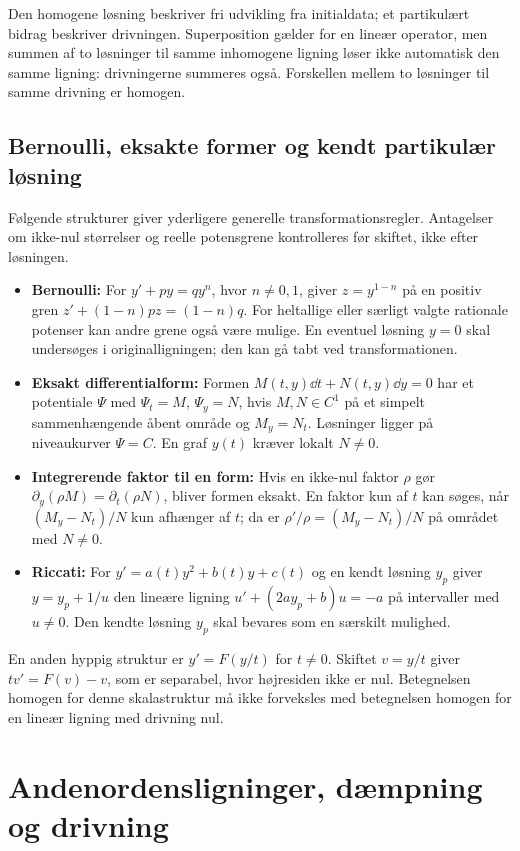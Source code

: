Den homogene løsning beskriver fri udvikling fra initialdata; et
partikulært bidrag beskriver drivningen. Superposition gælder for en
lineær operator, men summen af to løsninger til samme inhomogene ligning
løser ikke automatisk den samme ligning: drivningerne summeres også.
Forskellen mellem to løsninger til samme drivning er homogen.

\subsection{Bernoulli, eksakte former og kendt partikulær løsning}
Følgende strukturer giver yderligere generelle transformationsregler.
Antagelser om ikke-nul størrelser og reelle potensgrene kontrolleres
før skiftet, ikke efter løsningen.
\begin{itemize}
\item \textbf{Bernoulli:} For $y'+py=qy^n$, hvor $n\ne0,1$, giver
$z=y^{1-n}$ på en positiv gren
$z'+(1-n)pz=(1-n)q$. For heltallige eller særligt valgte rationale
potenser kan andre grene også være mulige. En eventuel løsning $y=0$
skal undersøges i originalligningen; den kan gå tabt ved transformationen.
\item \textbf{Eksakt differentialform:} Formen
$M(t,y)\dd t+N(t,y)\dd y=0$ har et potentiale $\Psi$ med
$\Psi_t=M$, $\Psi_y=N$, hvis $M,N\in C^1$ på et simpelt sammenhængende
åbent område og $M_y=N_t$. Løsninger ligger på niveaukurver
$\Psi=C$. En graf $y(t)$ kræver lokalt $N\ne0$.
\item \textbf{Integrerende faktor til en form:} Hvis en ikke-nul faktor
$\rho$ gør $\partial_y(\rho M)=\partial_t(\rho N)$, bliver formen
eksakt. En faktor kun af $t$ kan søges, når
$(M_y-N_t)/N$ kun afhænger af $t$; da er
$\rho'/\rho=(M_y-N_t)/N$ på området med $N\ne0$.
\item \textbf{Riccati:} For $y'=a(t)y^2+b(t)y+c(t)$ og en kendt løsning
$y_p$ giver $y=y_p+1/u$ den lineære ligning
$u'+(2ay_p+b)u=-a$ på intervaller med $u\ne0$.
Den kendte løsning $y_p$ skal bevares som en særskilt mulighed.
\end{itemize}
En anden hyppig struktur er $y'=F(y/t)$ for $t\ne0$. Skiftet $v=y/t$
giver $t v'=F(v)-v$, som er separabel, hvor højresiden ikke er nul.
Betegnelsen homogen for denne skalastruktur må ikke forveksles med
betegnelsen homogen for en lineær ligning med drivning nul.

\section{Andenordensligninger, dæmpning og drivning}
\label{sec:ode-andenorden}

